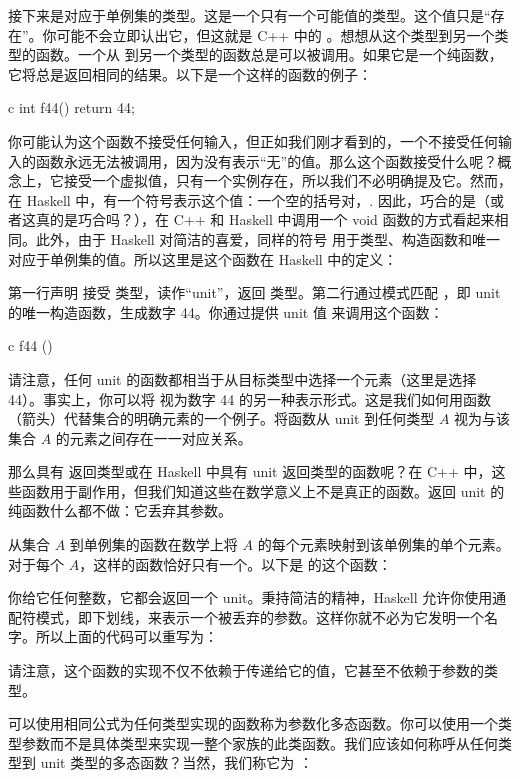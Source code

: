 接下来是对应于单例集的类型。这是一个只有一个可能值的类型。这个值只是“存在”。你可能不会立即认出它，但这就是 C++ 中的 。想想从这个类型到另一个类型的函数。一个从  到另一个类型的函数总是可以被调用。如果它是一个纯函数，它将总是返回相同的结果。以下是一个这样的函数的例子：

\begin{snip}{c}
  int f44() { return 44; }
\end{snip}
你可能认为这个函数不接受任何输入，但正如我们刚才看到的，一个不接受任何输入的函数永远无法被调用，因为没有表示“无”的值。那么这个函数接受什么呢？概念上，它接受一个虚拟值，只有一个实例存在，所以我们不必明确提及它。然而，在 Haskell 中，有一个符号表示这个值：一个空的括号对，\code{()}. 因此，巧合的是（或者这真的是巧合吗？），在 C++ 和 Haskell 中调用一个 void 函数的方式看起来相同。此外，由于 Haskell 对简洁的喜爱，同样的符号 \code{()} 用于类型、构造函数和唯一对应于单例集的值。所以这里是这个函数在 Haskell 中的定义：

第一行声明  接受 \code{()} 类型，读作“unit”，返回  类型。第二行通过模式匹配 \code{()}，即 unit 的唯一构造函数，生成数字 44。你通过提供 unit 值 \code{()} 来调用这个函数：

\begin{snip}{c}
  f44 ()
\end{snip}
请注意，任何 unit 的函数都相当于从目标类型中选择一个元素（这里是选择  44）。事实上，你可以将  视为数字 44 的另一种表示形式。这是我们如何用函数（箭头）代替集合的明确元素的一个例子。将函数从 unit 到任何类型 $A$ 视为与该集合 $A$ 的元素之间存在一一对应关系。

那么具有  返回类型或在 Haskell 中具有 unit 返回类型的函数呢？在 C++ 中，这些函数用于副作用，但我们知道这些在数学意义上不是真正的函数。返回 unit 的纯函数什么都不做：它丢弃其参数。

从集合 $A$ 到单例集的函数在数学上将 $A$ 的每个元素映射到该单例集的单个元素。对于每个 $A$，这样的函数恰好只有一个。以下是  的这个函数：

你给它任何整数，它都会返回一个 unit。秉持简洁的精神，Haskell 允许你使用通配符模式，即下划线，来表示一个被丢弃的参数。这样你就不必为它发明一个名字。所以上面的代码可以重写为：

请注意，这个函数的实现不仅不依赖于传递给它的值，它甚至不依赖于参数的类型。

可以使用相同公式为任何类型实现的函数称为参数化多态函数。你可以使用一个类型参数而不是具体类型来实现一整个家族的此类函数。我们应该如何称呼从任何类型到 unit 类型的多态函数？当然，我们称它为 ：

